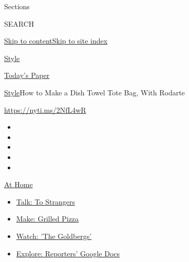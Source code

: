 Sections

SEARCH

\protect\hyperlink{site-content}{Skip to
content}\protect\hyperlink{site-index}{Skip to site index}

\href{https://www.nytimes3xbfgragh.onion/section/style}{Style}

\href{https://myaccount.nytimes3xbfgragh.onion/auth/login?response_type=cookie\&client_id=vi}{}

\href{https://www.nytimes3xbfgragh.onion/section/todayspaper}{Today's
Paper}

\href{/section/style}{Style}\textbar{}How to Make a Dish Towel Tote Bag,
With Rodarte

\url{https://nyti.ms/2NfL4wR}

\begin{itemize}
\item
\item
\item
\item
\item
\end{itemize}

\href{https://www.nytimes3xbfgragh.onion/spotlight/at-home?action=click\&pgtype=Article\&state=default\&region=TOP_BANNER\&context=at_home_menu}{At
Home}

\begin{itemize}
\tightlist
\item
  \href{https://www.nytimes3xbfgragh.onion/2020/08/03/well/family/the-benefits-of-talking-to-strangers.html?action=click\&pgtype=Article\&state=default\&region=TOP_BANNER\&context=at_home_menu}{Talk:
  To Strangers}
\item
  \href{https://www.nytimes3xbfgragh.onion/2020/08/01/at-home/coronavirus-make-pizza-on-a-grill.html?action=click\&pgtype=Article\&state=default\&region=TOP_BANNER\&context=at_home_menu}{Make:
  Grilled Pizza}
\item
  \href{https://www.nytimes3xbfgragh.onion/2020/07/31/arts/television/goldbergs-abc-stream.html?action=click\&pgtype=Article\&state=default\&region=TOP_BANNER\&context=at_home_menu}{Watch:
  'The Goldbergs'}
\item
  \href{https://www.nytimes3xbfgragh.onion/interactive/2020/at-home/even-more-reporters-editors-diaries-lists-recommendations.html?action=click\&pgtype=Article\&state=default\&region=TOP_BANNER\&context=at_home_menu}{Explore:
  Reporters' Google Docs}
\end{itemize}

